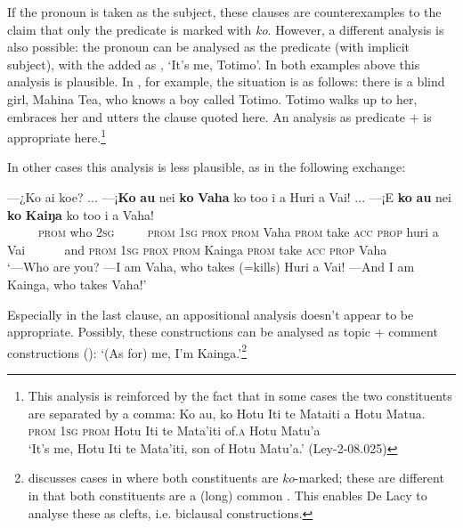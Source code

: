 If the pronoun is taken as the subject, these clauses are counterexamples to the claim that only the predicate is marked with \textit{ko}. However, a different analysis is also possible: the pronoun can be analysed as the predicate (with implicit subject), with the  added as , ‘It’s me, Totimo’. In both examples above this analysis is plausible. In , for example, the situation is as follows: there is a blind girl, Mahina Tea, who knows a boy called Totimo. Totimo walks up to her, embraces her and utters the clause quoted here. An analysis as predicate +  is appropriate here.\footnote{\label{fn:463}This analysis is reinforced by the fact that in some cases the two constituents are separated by a comma:
\ea \gll 
Ko au, ko Hotu {\ꞌ}Iti te Mata{\ꞌ}iti {\ꞌ}a Hotu Matu{\ꞌ}a.\\
  \textsc{prom} \textsc{1sg} \textsc{prom} Hotu Iti te Mata’iti of\textsc{.a} Hotu Matu’a\\
  \glt 
  ‘It’s me, Hotu Iti te Mata’iti, son of Hotu Matu’a.’ (Ley-2-08.025)\z } 

In other cases this analysis is less plausible, as in the following exchange:

\ea\label{ex:9.19}
\gll —¿Ko ai koe? ... —¡\textbf{Ko} \textbf{au} nei \textbf{ko} \textbf{Vaha} ko to{\ꞌ}o i a Huri {\ꞌ}a Vai! ... —¡{\ꞌ}E \textbf{ko} \textbf{au} nei \textbf{ko} \textbf{Kaiŋa} ko to{\ꞌ}o i a Vaha! \\
~~~~~\textsc{prom} who \textsc{2sg}  ~ ~~~\textsc{prom} \textsc{1sg} \textsc{prox} \textsc{prom} Vaha \textsc{prom} take \textsc{acc} \textsc{prop} huri a Vai  ~ ~~~~and \textsc{prom} \textsc{1sg} \textsc{prox} \textsc{prom} Kainga \textsc{prom} take \textsc{acc} \textsc{prop} Vaha \\

\glt
‘—Who are you? —I am Vaha, who takes (=kills) Huri a Vai! —And I am Kainga, who takes Vaha!’ \textstyleExampleref{[R304.97-101]}
\z

Especially in the last clause, an appositional analysis doesn’t appear to be appropriate. Possibly, these constructions can be analysed as topic + comment constructions (): ‘(As for) me, I’m Kainga.’\footnote{\label{fn:464}\citet[47]{DeLacy1999} discusses cases in  where both constituents are \textit{ko}-marked; these are different in that both constituents are a (long) common . This enables De Lacy to analyse these as clefts, i.e. biclausal constructions.} 

